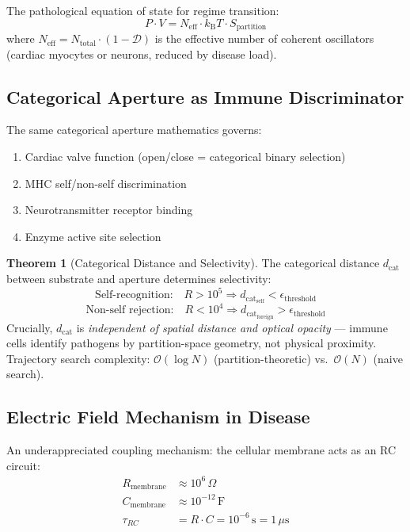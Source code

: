 \documentclass[12pt,a4paper]{article}
\theoremstyle{definition}
\newtheorem{theorem}{Theorem}
\newcommand{\kBT}{k_{\text{B}}T}
\newcommand{\dcat}{d_{\text{cat}}}
\begin{document}
The pathological equation of state for regime transition:
\begin{equation}
P \cdot V = N_{\text{eff}} \cdot \kBT \cdot S_{\text{partition}}
\end{equation}
where $N_{\text{eff}} = N_{\text{total}} \cdot (1 - \mathcal{D})$ is the effective
number of coherent oscillators (cardiac myocytes or neurons, reduced by disease load).

\subsection{Categorical Aperture as Immune Discriminator}

The same categorical aperture mathematics governs:
\begin{enumerate}
\item Cardiac valve function (open/close = categorical binary selection)
\item MHC self/non-self discrimination
\item Neurotransmitter receptor binding
\item Enzyme active site selection
\end{enumerate}

\begin{theorem}[Categorical Distance and Selectivity]
The categorical distance $\dcat$ between substrate and aperture determines selectivity:
\begin{equation}
\text{Self-recognition:}\quad R > 10^5 \Rightarrow \dcat_{\text{self}} < \epsilon_{\text{threshold}}
\end{equation}
\begin{equation}
\text{Non-self rejection:}\quad R < 10^4 \Rightarrow \dcat_{\text{foreign}} > \epsilon_{\text{threshold}}
\end{equation}
Crucially, $\dcat$ is \emph{independent of spatial distance and optical opacity} —
immune cells identify pathogens by partition-space geometry, not physical proximity.
Trajectory search complexity: $\mathcal{O}(\log N)$ (partition-theoretic)
vs.\ $\mathcal{O}(N)$ (naive search).
\end{theorem}

\subsection{Electric Field Mechanism in Disease}

An underappreciated coupling mechanism: the cellular membrane acts as an RC circuit:
\begin{align}
R_{\text{membrane}} &\approx 10^6\,\Omega\\
C_{\text{membrane}} &\approx 10^{-12}\,\text{F}\\
\tau_{RC} &= R \cdot C = 10^{-6}\,\text{s} = 1\,\mu\text{s}
\end{align}
\end{document}
